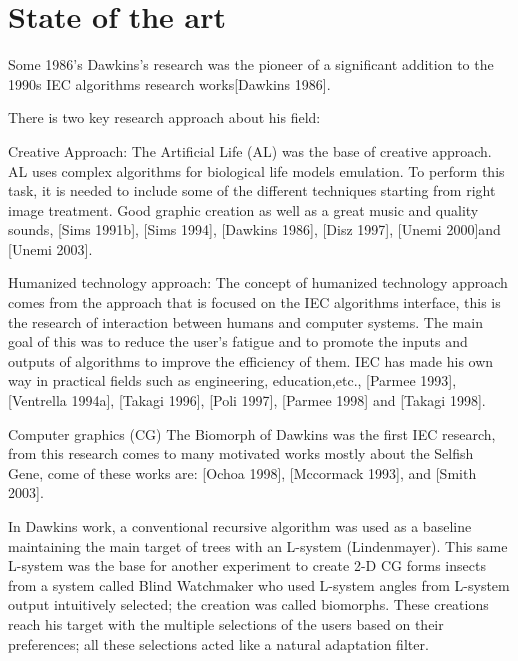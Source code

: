 \chapter{State of the art} \label{}


Some 1986's Dawkins's research was the pioneer of a significant addition to the
1990s IEC algorithms research works\cite{dawkins1986blind}[Dawkins 1986].

There is two key research approach about his field:

Creative Approach: The Artificial Life (AL) was the base of creative approach.
AL uses complex algorithms for biological life models emulation. To perform this
task, it is needed to include some of the different techniques starting from
right image treatment. Good graphic creation as well as a great music and
quality sounds, \cite{sims1991artificial}[Sims 1991b], \cite{sims1994evolving}[Sims 1994],
\cite{dawkins1986blind}[Dawkins 1986], \cite{disz1997ubiworld}[Disz 1997],
\cite{unemi2000sbart}[Unemi 2000]and \cite{unemi2003sbeat3}[Unemi
2003].
 
Humanized technology approach: The concept of humanized technology approach
comes from the approach that is focused on the IEC algorithms interface, this is
the research of interaction between humans and computer systems. The main goal
of this was to reduce the user's fatigue and to promote the inputs and outputs
of algorithms to improve the efficiency of them. IEC has made his own way in
practical fields such as engineering, education,etc.,
\cite{parmee1993concrete}[Parmee 1993], \cite{ventrella1994explorations}[Ventrella 1994a],
\cite{takagi1996discrete}[Takagi 1996], \cite{poli1997genetic}[Poli 1997],
\cite{parmee1998genetic}[Parmee 1998] and \cite{takagi1998interactive}[Takagi 1998].

Computer graphics (CG) The Biomorph of Dawkins was the first IEC research, from
this research comes to many motivated works mostly about the Selfish Gene, come
of these works are:  \cite{ochoa1998genetic}[Ochoa 1998],
\cite{mccormack1993interactive}[Mccormack 1993], and
\cite{}[Smith 2003].

In Dawkins work, a conventional recursive algorithm was used as a baseline
maintaining the main target of trees with an L-system (Lindenmayer). This same
L-system was the base for another experiment to create 2-D CG forms insects from
a system called Blind Watchmaker who used L-system angles from L-system output
intuitively selected; the creation was called biomorphs. These creations reach
his target with the multiple selections of the users based on their preferences;
all these selections acted like a natural adaptation filter.

